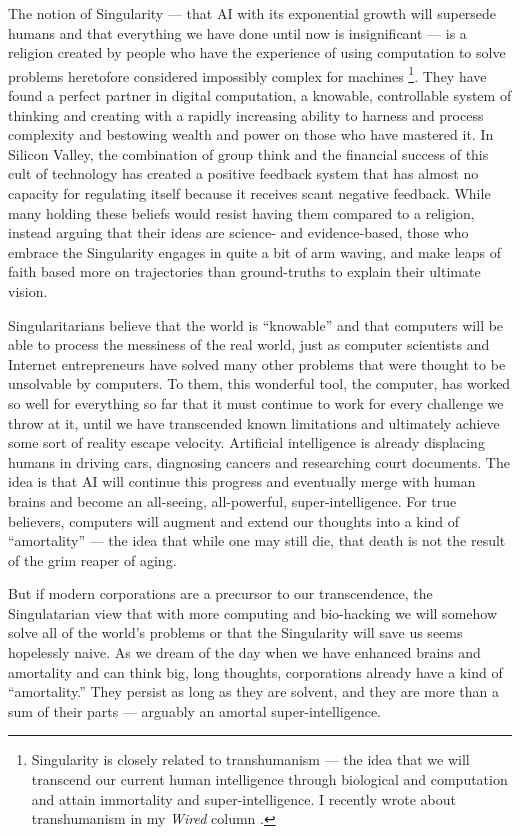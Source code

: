 The notion of Singularity --- that \ac{AI} with its exponential growth will supersede humans and that everything we have done until now is insignificant --- is a religion created by people who have the experience of using computation to solve problems heretofore considered impossibly complex for machines \footnote{Singularity is closely related to transhumanism --- the idea that we will transcend our current human intelligence through biological and computation and attain immortality and super-intelligence. I recently wrote about transhumanism in my \textit{Wired} column \cite{ito2018transhuman}.}. They have found a perfect partner in digital computation, a knowable, controllable system of thinking and creating with a rapidly increasing ability to harness and process complexity and bestowing wealth and power on those who have mastered it. In Silicon Valley, the combination of group think and the financial success of this cult of technology has created a positive feedback system that has almost no capacity for regulating itself because it receives scant negative feedback. While many holding these beliefs would resist having them compared to a religion, instead arguing that their ideas are science- and evidence-based, those who embrace the Singularity engages in quite a bit of arm waving, and make leaps of faith based more on trajectories than ground-truths to explain their ultimate vision.

Singularitarians believe that the world is ``knowable'' and that computers will be able to process the messiness of the real world, just as computer scientists and Internet entrepreneurs have solved many other problems that were thought to be unsolvable by computers. To them, this wonderful tool, the computer, has worked so well for everything so far that it must continue to work for every challenge we throw at it, until we have transcended known limitations and ultimately achieve some sort of reality escape velocity. Artificial intelligence is already displacing humans in driving cars, diagnosing cancers and researching court documents. The idea is that \ac{AI} will continue this progress and eventually merge with human brains and become an all-seeing, all-powerful, super-intelligence. For true believers, computers will augment and extend our thoughts into a kind of ``amortality'' --- the idea that while one may still die, that death is not the result of the grim reaper of aging.

But if modern corporations are a precursor to our transcendence, the Singulatarian view that with more computing and bio-hacking we will somehow solve all of the world's problems or that the Singularity will save us seems hopelessly naive. As we dream of the day when we have enhanced brains and amortality and can think big, long thoughts, corporations already have a kind of ``amortality.'' They persist as long as they are solvent, and they are more than a sum of their parts --- arguably an amortal super-intelligence.

